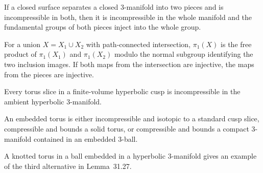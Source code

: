 \begin{lemma}
\label{lem:chow-iv-separating-incompressible-surfaces}
If a closed surface separates a closed 3-manifold into two pieces and is
incompressible in both, then it is incompressible in the whole manifold and the
fundamental groups of both pieces inject into the whole group.
\end{lemma}

\begin{theorem}
\label{thm:chow-iv-seifert-van-kampen}
For a union \(X=X_1\cup X_2\) with path-connected intersection,
\(\pi_1(X)\) is the free product of \(\pi_1(X_1)\) and \(\pi_1(X_2)\) modulo
the normal subgroup identifying the two inclusion images.  If both maps from
the intersection are injective, the maps from the pieces are injective.
\end{theorem}

\begin{lemma}
\label{lem:chow-iv-boundary-torus-incompressible}
Every torus slice in a finite-volume hyperbolic cusp is incompressible in the
ambient hyperbolic 3-manifold.
\end{lemma}

\begin{lemma}
\label{lem:chow-iv-embedded-torus-trichotomy}
An embedded torus is either incompressible and isotopic to a standard cusp
slice, compressible and bounds a solid torus, or compressible and bounds a
compact 3-manifold contained in an embedded 3-ball.
\end{lemma}

\begin{example}
\label{ex:chow-iv-knotted-compressible-torus}
A knotted torus in a ball embedded in a hyperbolic 3-manifold gives an example
of the third alternative in Lemma~31.27.
\end{example}

